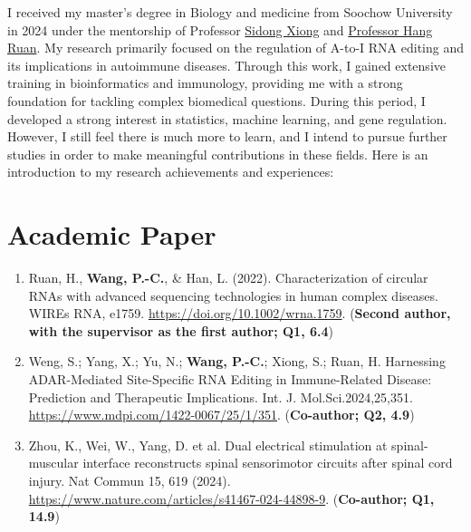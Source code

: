 
\thispagestyle{empty}

I received my master’s degree in Biology and medicine from Soochow University in 2024 under the mentorship of Professor \href{https://ibms.suda.edu.cn/3477/list.htm}{Sidong Xiong} and \href{http://web.suda.edu.cn/rh/}{Professor Hang Ruan}. My research primarily focused on the regulation of A-to-I RNA editing and its implications in autoimmune diseases. Through this work, I gained extensive training in bioinformatics and immunology, providing me with a strong foundation for tackling complex biomedical questions. 
During this period, I developed a strong interest in statistics, machine learning, and gene regulation. However, I still feel there is much more to learn, and I intend to pursue further studies in order to make meaningful contributions in these fields. Here is an introduction to my research achievements and experiences: 

\section{Academic Paper}
\begin{enumerate}[label=\arabic*]
	\item \label{circrna} Ruan, H., \textbf{Wang, P.-C.}, \& Han, L. (2022). Characterization of circular RNAs with advanced sequencing technologies in human complex diseases. WIREs RNA, e1759. \url{https://doi.org/10.1002/wrna.1759}. (\textbf{Second author, with the supervisor as the first author; Q1, 6.4})

    \item \label{adar} Weng, S.; Yang, X.; Yu, N.; \textbf{Wang, P.-C.}; Xiong, S.; Ruan, H. Harnessing ADAR-Mediated Site-Specific RNA Editing in Immune-Related Disease: Prediction and Therapeutic Implications. Int. J. Mol.Sci.2024,25,351. \url{https://www.mdpi.com/1422-0067/25/1/351}. (\textbf{Co-author; Q2, 4.9})

    \item \label{nc} Zhou, K., Wei, W., Yang, D. et al. Dual electrical stimulation at spinal-muscular interface reconstructs spinal sensorimotor circuits after spinal cord injury. Nat Commun 15, 619 (2024). \url{https://www.nature.com/articles/s41467-024-44898-9}. (\textbf{Co-author; Q1, 14.9})
\end{enumerate}

